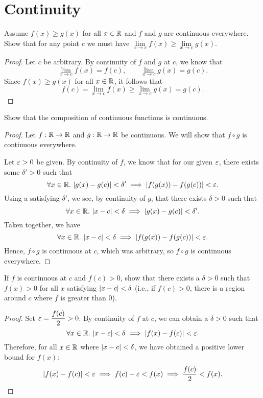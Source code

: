 \section{Continuity}

\begin{problem}
  Assume $f(x) \geq g(x)$ for all $x \in \mathbb{R}$ and $f$ and $g$ are continuous
  everywhere. Show that for any point $c$ we must have $\lim\limits_{x \to c}
  f(x) \geq \lim\limits_{x \to c} g(x)$.

  \begin{proof}
    Let $c$ be arbitrary. By continuity of $f$ and $g$ at $c$, we know that 
    \[
      \lim\limits_{x \to c} f(x) = f(c), \qquad \lim\limits_{x \to c} g(x) = g(c).
    \] 
    Since $f(x) \geq g(x)$ for all $x \in \mathbb{R}$, it follows that 
    \[
      f(c) = \lim\limits_{x \to c} f(x) \geq \lim\limits_{x \to c} g(x) = g(c).
    \]
  \end{proof}

\end{problem}

\begin{problem}
  \label{prob:composition-continuous}
  Show that the composition of continuous functions is continuous.

  \begin{proof}
    Let $f : \mathbb{R} \to \mathbb{R}$ and $g : \mathbb{R} \to \mathbb{R}$ be continuous. We will show that
    $f \circ g$ is continuous everywhere.

    Let $\varepsilon > 0$ be given. By continuity of $f$, we know that for our given $\varepsilon$,
    there exists some $\delta' > 0$ such that
    \[
      \forall x \in \mathbb{R}.\, \left\lvert g(x) - g(c) \right\rvert < \delta' \implies \left\lvert f(g(x)) - f(g(c)) \right\rvert < \varepsilon.
    \]
    Using a satisfying $\delta'$, we see, by continuity of $g$, that there
    exists $\delta > 0$ such that
    \[
      \forall x \in \mathbb{R}.\, \left\lvert x - c \right\rvert < \delta \implies \left\lvert g(x) - g(c) \right\rvert < \delta'.
    \]
    Taken together, we have
    \[
      \forall x \in \mathbb{R}.\, \left\lvert x - c \right\rvert < \delta \implies \left\lvert f(g(x)) - f(g(c)) \right\rvert < \varepsilon.
    \]
    Hence, $f \circ g$ is continuous at $c$, which was arbitrary, so $f \circ
    g$ is continuous everywhere.
  \end{proof}

\end{problem}

\begin{problem}
  If $f$ is continuous at $c$ and $f(c) > 0$, show that there exists a $\delta > 0$ such that $f(x) > 0$ for all
  $x$ satisfying $\left\lvert x - c \right\rvert < \delta$ (i.e., if $f(c) > 0$, there is a region around $c$ where $f$ is greater than $0$).

  \begin{proof}
    Set $\varepsilon = \dfrac{f(c)}{2} > 0$. By continuity of $f$ at $c$, we can obtain a $\delta > 0$ such that
    \[
      \forall x \in \mathbb{R}.\, \left\lvert x - c \right\rvert < \delta \implies \left\lvert f(x) - f(c) \right\rvert < \varepsilon.
    \]
    Therefore, for all $x \in \mathbb{R}$ where $\left\lvert x - c \right\rvert < \delta$, we have obtained a positive lower bound for $f(x)$:
    \[
      \left\lvert f(x) - f(c) \right\rvert < \varepsilon \implies f(c) - \varepsilon < f(x) \implies \frac{f(c)}{2} < f(x).
    \]
  \end{proof}

\end{problem}

